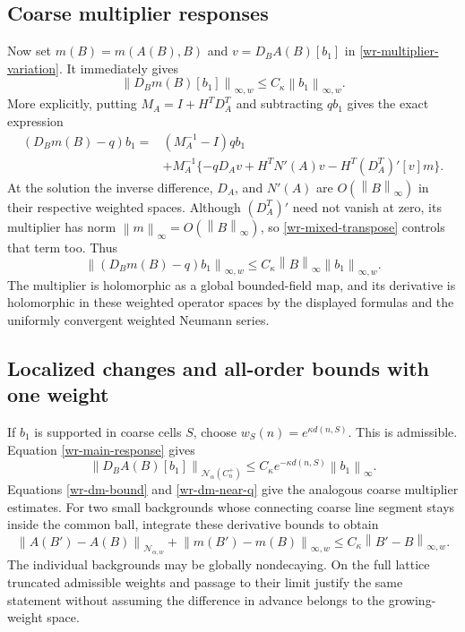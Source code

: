 \documentclass[11pt]{article}
\theoremstyle{remark}
\newcommand{\norm}[1]{\left\|#1\right\|}
\begin{document}
\subsection{Coarse multiplier responses}
\label{wr-multiplier-responses}

Now set $m(B)=m(A(B),B)$ and
$v=D_BA(B)[b_1]$ in \eqref{wr-multiplier-variation}. It immediately
gives
\begin{equation}\label{wr-dm-bound}
 \norm{D_Bm(B)[b_1]}_{\infty,w}
 \le C_\kappa\norm{b_1}_{\infty,w}.
\end{equation}
More explicitly, putting $M_A=I+H^TD_A^T$ and subtracting
$qb_1$ gives the exact expression
\begin{equation}\label{wr-dm-remainder}
 \begin{split}
 (D_Bm(B)-q)b_1={}&(M_A^{-1}-I)qb_1\\
 &+M_A^{-1}\{-qD_Av+H^TN'(A)v-H^T(D_A^T)'[v]m\}.
 \end{split}
\end{equation}
At the solution the inverse difference, $D_A$, and $N'(A)$
are $O(\norm{B}_\infty)$ in their respective weighted spaces.
Although $(D_A^T)'$ need not vanish at zero, its multiplier
has norm $\norm{m}_\infty=O(\norm{B}_\infty)$, so
\eqref{wr-mixed-transpose} controls that term too. Thus
\begin{equation}\label{wr-dm-near-q}
 \boxed{\quad
 \norm{(D_Bm(B)-q)b_1}_{\infty,w}
 \le C_\kappa\norm{B}_\infty\norm{b_1}_{\infty,w}.
 \quad}
\end{equation}
The multiplier is holomorphic as a global bounded-field map,
and its derivative is holomorphic in these weighted operator
spaces by the displayed formulas and the uniformly convergent
weighted Neumann series.

\subsection{Localized changes and all-order bounds with one weight}
\label{wr-localization}

If $b_1$ is supported in coarse cells $S$, choose
$w_S(n)=e^{\kappa d(n,S)}$. This is admissible. Equation
\eqref{wr-main-response} gives
\begin{equation}\label{wr-local-response}
 \norm{D_BA(B)[b_1]}_{\mathcal N_\alpha(C_n^+)}
 \le C_\kappa e^{-\kappa d(n,S)}\norm{b_1}_\infty.
\end{equation}
Equations \eqref{wr-dm-bound} and \eqref{wr-dm-near-q}
give the analogous coarse multiplier estimates. For two small
backgrounds whose connecting coarse line segment stays inside
the common ball, integrate these derivative bounds to obtain
\begin{equation}\label{wr-finite-difference}
 \norm{A(B')-A(B)}_{\mathcal N_{\alpha,w}}
 +\norm{m(B')-m(B)}_{\infty,w}
 \le C_\kappa\norm{B'-B}_{\infty,w}.
\end{equation}
The individual backgrounds may be globally nondecaying. On the
full lattice truncated admissible weights and passage to their
limit justify the same statement without assuming the difference
in advance belongs to the growing-weight space.
\end{document}
